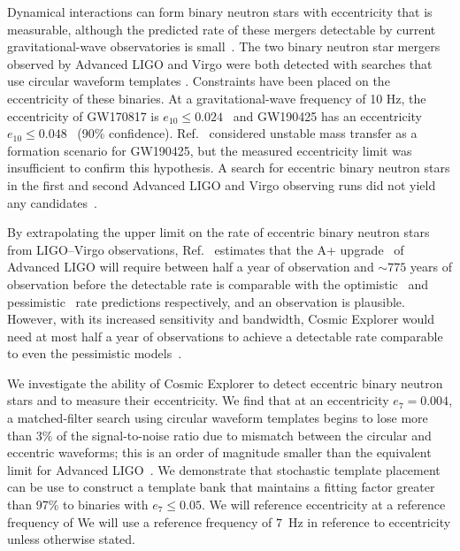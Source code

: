 Dynamical interactions can form binary neutron stars with eccentricity that is measurable, although the predicted rate of these mergers detectable by current \\ gravitational-wave observatories is small~\cite{Lee:2009ca,Ye:2019xvf}. The two binary neutron star mergers observed by Advanced LIGO and Virgo \cite{TheLIGOScientific:2017qsa,Abbott:2020uma} were both detected with searches that use circular waveform templates \cite{Allen:2004gu,Allen:2005fk,Canton:2014ena,Usman:2015kfa,Nitz:2017svb,Sachdev:2019vvd,Cannon:2020qnf,Davies:2020tsx, DalCanton:2020vpm}. Constraints have been placed on the eccentricity of these binaries. At a gravitational-wave frequency of 10 Hz, the eccentricity of GW170817 is $e_{10} \leq 0.024$~\cite{Lenon:2020oza} and GW190425 has an eccentricity $e_{10} \leq 0.048$~\cite{Romero-Shaw:2020aaj, Lenon:2020oza} (90\% confidence). Ref.~\cite{Romero-Shaw:2020aaj} considered unstable mass transfer as a formation scenario for GW190425, but the measured eccentricity limit was insufficient to confirm this hypothesis. A search for eccentric binary neutron stars in the first and second Advanced LIGO and Virgo observing runs did not yield any candidates~\cite{Nitz:2019spj}.

By extrapolating the upper limit on the rate of eccentric binary neutron stars from LIGO--Virgo observations, Ref.~\cite{Nitz:2019spj} estimates that the A+ upgrade~\cite{Aasi:2013wya} of Advanced LIGO will require between half a year of observation and $\sim 775$ years of observation before the detectable rate is comparable with the optimistic~\cite{Lee:2009ca} and pessimistic~\cite{Ye:2019xvf} rate predictions respectively, and an observation is plausible.  However, with its increased sensitivity and bandwidth, Cosmic Explorer would need at most half a year of observations to achieve a detectable rate comparable to even the pessimistic models~\cite{Nitz:2019spj}.

We investigate the ability of Cosmic Explorer to detect eccentric binary neutron stars and to measure their eccentricity. We find that at an eccentricity $e_{7} = 0.004$, a matched-filter search using circular waveform templates begins to lose more than $3\%$ of the signal-to-noise ratio due to mismatch between the circular and eccentric waveforms; this is an order of magnitude smaller than the equivalent limit for Advanced LIGO~\cite{Brown:2009ng,Huerta:2013qb}. We demonstrate that stochastic template placement \cite{Harry:2009ea,Manca:2009xw} can be use to construct a template bank that maintains a fitting factor greater than 97\% to binaries with $e_{7} \le 0.05$. We will reference eccentricity at a reference frequency of We will use a reference frequency of $7$~Hz in reference to eccentricity unless otherwise stated.

